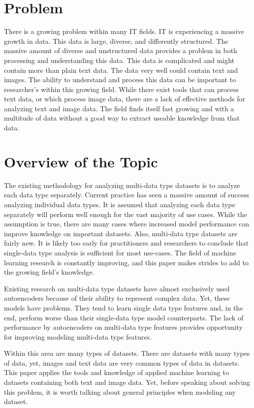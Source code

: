 
\chapter{Problem}
There is a growing problem within many IT fields.  IT is experiencing a massive growth in data.  This data is large, diverse, and differently structured.  The massive amount of diverse and unstructured data provides a problem in both processing and understanding this data.  This data is complicated and might contain more than plain text data.  The data very well could contain text and images.  The ability to understand and process this data can be important to researcher's within this growing field.  While there exist tools that can process text data, or which process image data, there are a lack of effective methods for analyzing text and image data.  The field finds itself fast growing and with a multitude of data without a good way to extract useable knowledge from that data. 

\chapter{Overview of the Topic}
The existing methodology for analyzing multi-data type datasets is to analyze each data type separately.  Current practice has seen a massive amount of success analyzing individual data types.  It is assumed that analyzing each data type separately will perform well enough for the vast majority of use cases.  While the assumption is true, there are many cases where increased model performance can improve knowledge on important datasets.  Also, multi-data type datasets are fairly new.  It is likely too early for practitioners and researchers to conclude that single-data type analysis is sufficient for most use-cases.  The field of machine learning research is constantly improving, and this paper makes strides to add to the growing field's knowledge.

Existing research on multi-data type datasets have almost exclusively used autoencoders because of their ability to represent complex data.  Yet, these models have problems.  They tend to learn single data type features and, in the end, perform worse than their single-data type model counterparts.  The lack of performance by autoencoders on multi-data type features provides opportunity for improving modeling multi-data type features.

Within this area are many types of datasets.  There are datasets with many types of data, yet, images and text data are very common types of data in datasets.  This paper applies the tools and knowledge of applied machine learning to datasets containing both text and image data.  Yet, before speaking about solving this problem, it is worth talking about general principles when modeling any dataset.  


